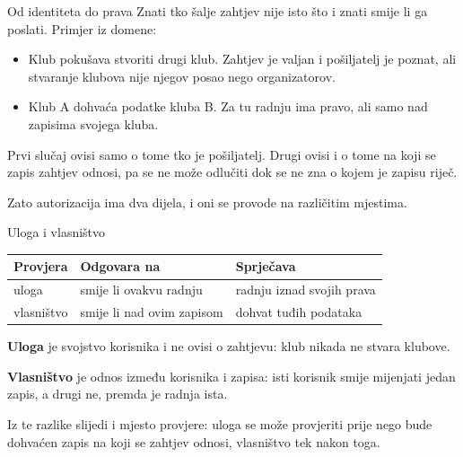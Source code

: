 
\begin{frame}{Od identiteta do prava}
Znati tko šalje zahtjev nije isto što i znati smije li ga poslati. Primjer iz domene:

\vspace{0.5em}
\begin{itemize}
  \item Klub pokušava stvoriti drugi klub. Zahtjev je valjan i pošiljatelj je poznat, ali stvaranje klubova nije njegov posao nego organizatorov.
  \item Klub A dohvaća podatke kluba B. Za tu radnju ima pravo, ali samo nad zapisima svojega kluba.
\end{itemize}

\vspace{0.5em}
Prvi slučaj ovisi samo o tome tko je pošiljatelj. Drugi ovisi i o tome na koji se zapis zahtjev odnosi, pa se ne može odlučiti dok se ne zna o kojem je zapisu riječ.

\vspace{0.3em}
Zato autorizacija ima dva dijela, i oni se provode na različitim mjestima.
\end{frame}

\begin{frame}{Uloga i vlasništvo}
\begin{center}
{\small
\setlength{\tabcolsep}{8pt}
\renewcommand{\arraystretch}{1.4}
\begin{tabular}{@{}lll@{}}
  \toprule
  \textbf{Provjera} & \textbf{Odgovara na} & \textbf{Sprječava} \\
  \midrule
  uloga      & smije li ovakvu radnju  & radnju iznad svojih prava \\
  vlasništvo & smije li nad ovim zapisom & dohvat tuđih podataka \\
  \bottomrule
\end{tabular}
}
\end{center}

\vspace{0.6em}
\textbf{Uloga} je svojstvo korisnika i ne ovisi o zahtjevu: klub nikada ne stvara klubove.

\vspace{0.3em}
\textbf{Vlasništvo} je odnos između korisnika i zapisa: isti korisnik smije mijenjati jedan zapis, a drugi ne, premda je radnja ista.

\vspace{0.4em}
Iz te razlike slijedi i mjesto provjere: uloga se može provjeriti prije nego bude dohvaćen zapis na koji se zahtjev odnosi, vlasništvo tek nakon toga.
\end{frame}


